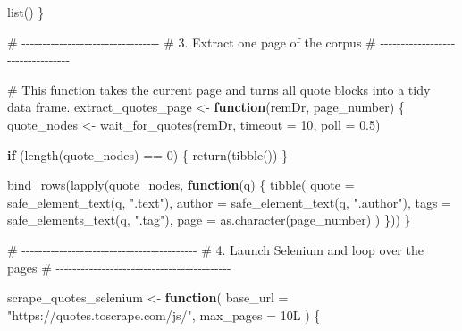 \documentclass[
  letterpaper,
  DIV=11,
  numbers=noendperiod]{scrreprt}
\newenvironment{Shaded}{\begin{snugshade}}{\end{snugshade}}
\newcommand{\AttributeTok}[1]{\textcolor[rgb]{0.40,0.45,0.13}{#1}}
\newcommand{\CommentTok}[1]{\textcolor[rgb]{0.37,0.37,0.37}{#1}}
\newcommand{\ControlFlowTok}[1]{\textcolor[rgb]{0.00,0.23,0.31}{\textbf{#1}}}
\newcommand{\DecValTok}[1]{\textcolor[rgb]{0.68,0.00,0.00}{#1}}
\newcommand{\FloatTok}[1]{\textcolor[rgb]{0.68,0.00,0.00}{#1}}
\newcommand{\FunctionTok}[1]{\textcolor[rgb]{0.28,0.35,0.67}{#1}}
\newcommand{\NormalTok}[1]{\textcolor[rgb]{0.00,0.23,0.31}{#1}}
\newcommand{\OtherTok}[1]{\textcolor[rgb]{0.00,0.23,0.31}{#1}}
\newcommand{\SpecialCharTok}[1]{\textcolor[rgb]{0.37,0.37,0.37}{#1}}
\newcommand{\StringTok}[1]{\textcolor[rgb]{0.13,0.47,0.30}{#1}}
\begin{document}
\begin{Shaded}
\begin{Highlighting}[]
  \FunctionTok{list}\NormalTok{()}
\NormalTok{\}}

\CommentTok{\# {-}{-}{-}{-}{-}{-}{-}{-}{-}{-}{-}{-}{-}{-}{-}{-}{-}{-}{-}{-}{-}{-}{-}{-}{-}{-}{-}{-}{-}{-}{-}{-}{-}}
\CommentTok{\# 3. Extract one page of the corpus}
\CommentTok{\# {-}{-}{-}{-}{-}{-}{-}{-}{-}{-}{-}{-}{-}{-}{-}{-}{-}{-}{-}{-}{-}{-}{-}{-}{-}{-}{-}{-}{-}{-}{-}{-}{-}}

\CommentTok{\# This function takes the current page and turns all quote blocks into a tidy data frame.}
\NormalTok{extract\_quotes\_page }\OtherTok{\textless{}{-}} \ControlFlowTok{function}\NormalTok{(remDr, page\_number) \{}
\NormalTok{  quote\_nodes }\OtherTok{\textless{}{-}} \FunctionTok{wait\_for\_quotes}\NormalTok{(remDr, }\AttributeTok{timeout =} \DecValTok{10}\NormalTok{, }\AttributeTok{poll =} \FloatTok{0.5}\NormalTok{)}
  
  \ControlFlowTok{if}\NormalTok{ (}\FunctionTok{length}\NormalTok{(quote\_nodes) }\SpecialCharTok{==} \DecValTok{0}\NormalTok{) \{}
    \FunctionTok{return}\NormalTok{(}\FunctionTok{tibble}\NormalTok{())}
\NormalTok{  \}}
  
  \FunctionTok{bind\_rows}\NormalTok{(}\FunctionTok{lapply}\NormalTok{(quote\_nodes, }\ControlFlowTok{function}\NormalTok{(q) \{}
    \FunctionTok{tibble}\NormalTok{(}
      \AttributeTok{quote  =} \FunctionTok{safe\_element\_text}\NormalTok{(q, }\StringTok{".text"}\NormalTok{),}
      \AttributeTok{author =} \FunctionTok{safe\_element\_text}\NormalTok{(q, }\StringTok{".author"}\NormalTok{),}
      \AttributeTok{tags   =} \FunctionTok{safe\_elements\_text}\NormalTok{(q, }\StringTok{".tag"}\NormalTok{),}
      \AttributeTok{page   =} \FunctionTok{as.character}\NormalTok{(page\_number)}
\NormalTok{    )}
\NormalTok{  \}))}
\NormalTok{\}}

\CommentTok{\# {-}{-}{-}{-}{-}{-}{-}{-}{-}{-}{-}{-}{-}{-}{-}{-}{-}{-}{-}{-}{-}{-}{-}{-}{-}{-}{-}{-}{-}{-}{-}{-}{-}{-}{-}{-}{-}{-}{-}{-}{-}{-}}
\CommentTok{\# 4. Launch Selenium and loop over the pages}
\CommentTok{\# {-}{-}{-}{-}{-}{-}{-}{-}{-}{-}{-}{-}{-}{-}{-}{-}{-}{-}{-}{-}{-}{-}{-}{-}{-}{-}{-}{-}{-}{-}{-}{-}{-}{-}{-}{-}{-}{-}{-}{-}{-}{-}}

\NormalTok{scrape\_quotes\_selenium }\OtherTok{\textless{}{-}} \ControlFlowTok{function}\NormalTok{(}
  \AttributeTok{base\_url =} \StringTok{"https://quotes.toscrape.com/js/"}\NormalTok{,}
  \AttributeTok{max\_pages =} \DecValTok{10}\NormalTok{L}
\NormalTok{) \{}
  

\end{Highlighting}
\end{Shaded}
\end{document}
